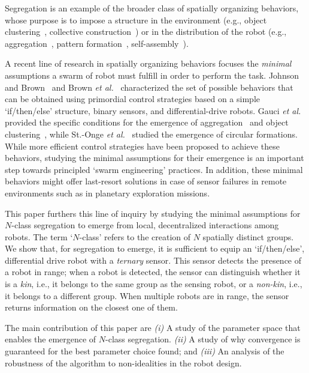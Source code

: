 \documentclass[conference]{IEEEtran}
\begin{document}
Segregation is an example of the broader class of spatially organizing
behaviors, whose purpose is to impose a structure in the environment (e.g.,
object clustering~\cite{gauci_clustering_2014}, collective
construction~\cite{Bolger2010}) or in the distribution of the robot (e.g.,
aggregation~\cite{shlyakhov_survey_2017}, pattern
formation~\cite{Pinciroli:DARS2016}, self-assembly~\cite{gross2008self}).

A recent line of research in spatially organizing behaviors focuses the
\emph{minimal} assumptions a swarm of robot must fulfill in order to perform the
task. Johnson and Brown~\cite{johnson_evolving_2016} and Brown \emph{et
  al.}~\cite{brown_discovery_2018} characterized the set of possible behaviors
that can be obtained using primordial control strategies based on a simple
`if/then/else' structure, binary sensors, and differential-drive robots. Gauci
\emph{et al.} provided the specific conditions for the emergence of
aggregation~\cite{gauci_evolving_2014} and object
clustering~\cite{gauci_clustering_2014}, while St.-Onge \emph{et
  al.}~\cite{StOnge:IROS2018} studied the emergence of circular
formations. While more efficient control strategies have been proposed to
achieve these behaviors, studying the minimal assumptions for their emergence is
an important step towards principled `swarm engineering' practices. In addition,
these minimal behaviors might offer last-resort solutions in case of sensor
failures in remote environments such as in planetary exploration missions.

This paper furthers this line of inquiry by studying the minimal assumptions for
$N$-class segregation to emerge from local, decentralized interactions among
robots. The term `$N$-class' refers to the creation of $N$ spatially distinct
groups. We show that, for segregation to emerge, it is sufficient to equip an
`if/then/else', differential drive robot with a \emph{ternary} sensor. This
sensor detects the presence of a robot in range; when a robot is detected, the
sensor can distinguish whether it is a \emph{kin}, i.e., it belongs to the same
group as the sensing robot, or a \emph{non-kin}, i.e., it belongs to a different
group. When multiple robots are in range, the sensor returns information on the
closest one of them.

The main contribution of this paper are \emph{(i)} A study of the parameter
space that enables the emergence of $N$-class segregation. \emph{(ii)} A study
of why convergence is guaranteed for the best parameter choice found; and
\emph{(iii)} An analysis of the robustness of the algorithm to non-idealities in
the robot design.
\end{document}
